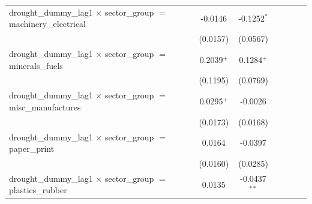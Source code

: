 \begin{tabular}{lcccccccc}
   drought\_dummy\_lag1 $\times$ sector\_group $=$ machinery\_electrical          &                       &                       & -0.0146               & -0.1252$^{*}$         &                       &                       &                       &   \\   
                                                                                  &                       &                       & (0.0157)              & (0.0567)              &                       &                       &                       &   \\   
   drought\_dummy\_lag1 $\times$ sector\_group $=$ minerals\_fuels                &                       &                       & 0.2039$^{+}$          & 0.1284$^{+}$          &                       &                       &                       &   \\   
                                                                                  &                       &                       & (0.1195)              & (0.0769)              &                       &                       &                       &   \\   
   drought\_dummy\_lag1 $\times$ sector\_group $=$ misc\_manufactures             &                       &                       & 0.0295$^{+}$          & -0.0026               &                       &                       &                       &   \\   
                                                                                  &                       &                       & (0.0173)              & (0.0168)              &                       &                       &                       &   \\   
   drought\_dummy\_lag1 $\times$ sector\_group $=$ paper\_print                   &                       &                       & 0.0164                & -0.0397               &                       &                       &                       &   \\   
                                                                                  &                       &                       & (0.0160)              & (0.0285)              &                       &                       &                       &   \\   
   drought\_dummy\_lag1 $\times$ sector\_group $=$ plastics\_rubber               &                       &                       & 0.0135                & -0.0437$^{**}$        &                       &                       &                       &   \\   

\end{tabular}
